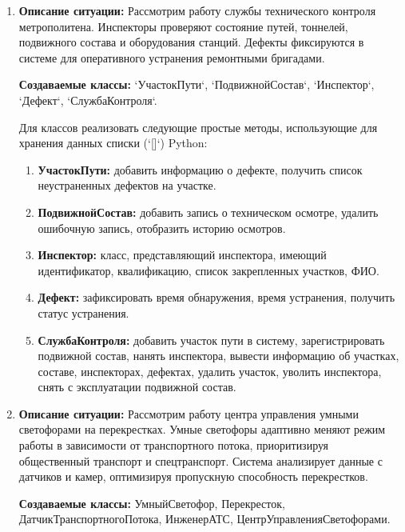 \begin{enumerate}
\item \textbf{Описание ситуации:} Рассмотрим работу службы технического контроля метрополитена. 
Инспекторы проверяют состояние путей, тоннелей, подвижного состава и оборудования станций. 
Дефекты фиксируются в системе для оперативного устранения ремонтными бригадами.

\textbf{Создаваемые классы:} `УчастокПути`, `ПодвижнойСостав`, `Инспектор`, `Дефект`, `СлужбаКонтроля`.

Для классов реализовать следующие простые методы, использующие для хранения данных списки (`[]`) Python:
\begin{enumerate}
    \item \textbf{УчастокПути:} добавить информацию о дефекте, 
    получить список неустраненных дефектов на участке.
    \item \textbf{ПодвижнойСостав:} добавить запись о техническом осмотре, 
    удалить ошибочную запись, отобразить историю осмотров.
    \item \textbf{Инспектор:} класс, представляющий инспектора, 
    имеющий идентификатор, квалификацию, список закрепленных участков, ФИО.
    \item \textbf{Дефект:} зафиксировать время обнаружения, 
    время устранения, получить статус устранения.
    \item \textbf{СлужбаКонтроля:} добавить участок пути в систему, 
    зарегистрировать подвижной состав, нанять инспектора, 
    вывести информацию об участках, составе, инспекторах, дефектах, удалить участок, уволить инспектора, 
    снять с эксплуатации подвижной состав.
\end{enumerate}

\item
\textbf{Описание ситуации:}
Рассмотрим работу центра управления умными светофорами на перекрестках. 
Умные светофоры адаптивно меняют режим работы в зависимости от транспортного потока, 
приоритизируя общественный транспорт и спецтранспорт. 
Система анализирует данные с датчиков и камер, оптимизируя пропускную способность перекрестков.

\textbf{Создаваемые классы:} УмныйСветофор, Перекресток, ДатчикТранспортногоПотока, ИнженерАТС, ЦентрУправленияСветофорами.


\end{enumerate}
